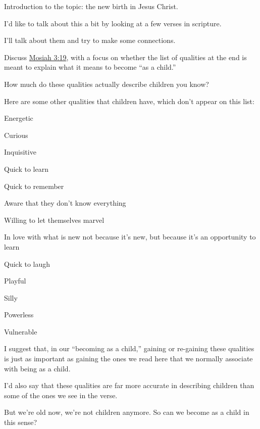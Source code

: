 		\begin{compactitem}
			\item Introduction to the topic: the new birth in Jesus Christ.
				\begin{compactitem}
					\item I'd like to talk about this a bit by looking at a few verses in scripture.
					\item I'll talk about them and try to make some connections.
				\end{compactitem}
			\item Discuss \hyperref[MOSIAH-3-19]{Mosiah 3:19}, with a focus on whether the list of qualities at the end is meant to explain what it means to become ``as a child.''
				\begin{compactitem}
					\item How much do these qualities actually describe children you know?
					\item Here are some other qualities that children have, which don't appear on this list:
						\begin{compactitem}
							\item Energetic
							\item Curious
							\item Inquisitive
							\item Quick to learn
							\item Quick to remember
							\item Aware that they don't know everything
							\item Willing to let themselves marvel
							\item In love with what is new not because it's new, but because it's an opportunity to learn
							\item Quick to laugh
							\item Playful
							\item Silly
							\item Powerless
							\item Vulnerable
						\end{compactitem}
					\item I suggest that, in our ``becoming as a child,'' gaining or re-gaining these qualities is just as important as gaining the ones we read here that we normally associate with being as a child.
					\item I'd also say that these qualities are far more accurate in describing children than some of the ones we see in the verse.
					\item But we're old now, we're not children anymore. So can we become as a child in this sense?

\end{compactitem}
\end{compactitem}
